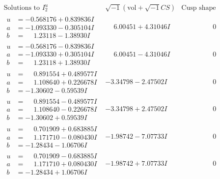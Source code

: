 \documentclass[1p]{elsarticle_modified}
\theoremstyle{definition}
\newcommand{\I}{\sqrt{-1}}
\begin{document}
$$\begin{array}{c|c|c}  
\text{Solutions to }I^u_{2}& \I (\text{vol} + \sqrt{-1}CS) & \text{Cusp shape}\\
 \hline 
\begin{aligned}
u &= -0.568176 + 0.839836 I \\
a &= -1.093330 - 0.305104 I \\
b &= \phantom{-}1.23118 - 1.38930 I\end{aligned}
 & \phantom{-}6.00451 + 4.31046 I & \phantom{-0.000000 } 0 \\ \hline\begin{aligned}
u &= -0.568176 - 0.839836 I \\
a &= -1.093330 + 0.305104 I \\
b &= \phantom{-}1.23118 + 1.38930 I\end{aligned}
 & \phantom{-}6.00451 - 4.31046 I & \phantom{-0.000000 } 0 \\ \hline\begin{aligned}
u &= \phantom{-}0.891554 + 0.489577 I \\
a &= \phantom{-}1.108640 + 0.226678 I \\
b &= -1.30602 - 0.59539 I\end{aligned}
 & -3.34798 - 2.47502 I & \phantom{-0.000000 } 0 \\ \hline\begin{aligned}
u &= \phantom{-}0.891554 - 0.489577 I \\
a &= \phantom{-}1.108640 - 0.226678 I \\
b &= -1.30602 + 0.59539 I\end{aligned}
 & -3.34798 + 2.47502 I & \phantom{-0.000000 } 0 \\ \hline\begin{aligned}
u &= \phantom{-}0.701909 + 0.683885 I \\
a &= \phantom{-}1.171710 - 0.080430 I \\
b &= -1.28434 - 1.06706 I\end{aligned}
 & -1.98742 - 7.07733 I & \phantom{-0.000000 } 0 \\ \hline\begin{aligned}
u &= \phantom{-}0.701909 - 0.683885 I \\
a &= \phantom{-}1.171710 + 0.080430 I \\
b &= -1.28434 + 1.06706 I\end{aligned}
 & -1.98742 + 7.07733 I & \phantom{-0.000000 } 0 \\ \hline\begin{aligned}

\end{aligned}
\end{array}$$
\end{document}
